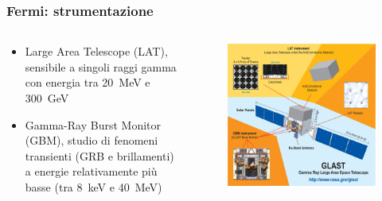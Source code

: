 \documentclass[10pt]{beamer}
\begin{document}
\begin{frame}
  \frametitle{Fermi: strumentazione}
  \begin{columns}
    \begin{column}{0.4\columnwidth}
      \begin{itemize}
      \item Large Area Telescope (LAT), sensibile a singoli raggi gamma con
        energia tra \SI{20}{\mega\electronvolt} e \SI{300}{\giga\electronvolt}
      \item Gamma-Ray Burst Monitor (GBM), studio di fenomeni transienti (GRB e
        brillamenti) a energie relativamente più basse (tra
        \SI{8}{\kilo\electronvolt} e \SI{40}{\mega\electronvolt})
      \end{itemize}
    \end{column}
    \begin{column}{0.6\columnwidth}
      \begin{figure}
        \centering
        \includegraphics[width=\columnwidth]{glast_schematic.jpg}
      \end{figure}
    \end{column}
  \end{columns}
\end{frame}
\end{document}

